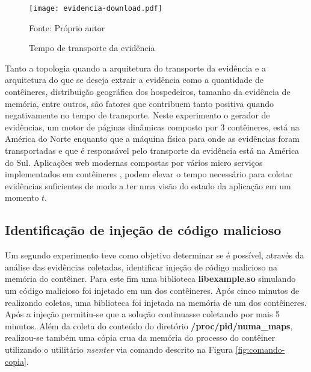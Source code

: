 \begin{figure}[htb!]
\footnotesize
\caption{Tempo de transporte da evidência}
\texttt{[image: evidencia-download.pdf]}
\centering
\label{fig:evidencia_transporte}
\begin{center}
Fonte: Próprio autor 
\end{center}
\end{figure}


%
Tanto a topologia quando a arquitetura do transporte da evidência e a arquitetura do que se deseja extrair a evidência como a quantidade de contêineres, distribuição geográfica dos hospedeiros, tamanho da evidência de memória, entre outros, são fatores que contribuem tanto positiva quando negativamente no tempo de transporte.
%
Neste experimento o gerador de evidências, um motor de páginas dinâmicas composto por 3 contêineres, está na América do Norte enquanto que a máquina física para onde as evidências foram transportadas e que é responsável pelo transporte da evidência está na América do Sul.
%
Aplicações web modernas compostas por vários micro serviços implementados em contêineres \cite{StubbsConteinersNumberMicroServices:2015}, podem elevar o tempo necessário para \fancyname coletar evidências suficientes de modo a ter uma visão do estado da aplicação em um momento $t$.

\subsection{Identificação de injeção de código malicioso}
\label{sec:proposta-exp-malware}

Um segundo experimento teve como objetivo determinar se é possível, através da análise das evidências coletadas, identificar injeção de código malicioso na memória do contêiner.
%
Para este fim uma biblioteca \textbf{libexample.so} simulando um código malicioso foi injetado em um dos contêineres.
%
Após cinco minutos de \fancyname realizando coletas, uma biblioteca foi injetada na memória de um dos contêineres. Após a injeção permitiu-se que a solução continuasse coletando por mais 5 minutos.
%
Além da coleta do conteúdo do diretório \textbf{/proc/pid/numa\_maps}, realizou-se também uma cópia crua da memória do processo do contêiner utilizando o utilitário \textit{nsenter} via comando descrito na Figura \ref{fig:comando-copia}.
%

%
%
%

